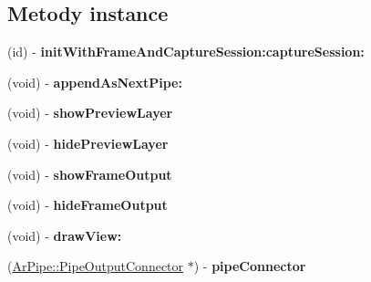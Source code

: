 \subsection*{Metody instance}
\begin{DoxyCompactItemize}
\item 
\hypertarget{interface_base_ar_view_aace15b18427bf737fd3c4273ae9e8c58}{(id) -\/ {\bfseries init\-With\-Frame\-And\-Capture\-Session\-:capture\-Session\-:}}\label{d5/d64/interface_base_ar_view_aace15b18427bf737fd3c4273ae9e8c58}

\item 
\hypertarget{interface_base_ar_view_a0e60ce8ce8fb1adc65ead18a2812a27a}{(void) -\/ {\bfseries append\-As\-Next\-Pipe\-:}}\label{d5/d64/interface_base_ar_view_a0e60ce8ce8fb1adc65ead18a2812a27a}

\item 
\hypertarget{interface_base_ar_view_ac69ba9a0fa58d9621f7e558c41f88471}{(void) -\/ {\bfseries show\-Preview\-Layer}}\label{d5/d64/interface_base_ar_view_ac69ba9a0fa58d9621f7e558c41f88471}

\item 
\hypertarget{interface_base_ar_view_ad94f53f246123743f7c754973e4a4be7}{(void) -\/ {\bfseries hide\-Preview\-Layer}}\label{d5/d64/interface_base_ar_view_ad94f53f246123743f7c754973e4a4be7}

\item 
\hypertarget{interface_base_ar_view_a89c6931f254b4d9a3e79f559bbc2ce35}{(void) -\/ {\bfseries show\-Frame\-Output}}\label{d5/d64/interface_base_ar_view_a89c6931f254b4d9a3e79f559bbc2ce35}

\item 
\hypertarget{interface_base_ar_view_a537347a63628e5c399ed2a610d005870}{(void) -\/ {\bfseries hide\-Frame\-Output}}\label{d5/d64/interface_base_ar_view_a537347a63628e5c399ed2a610d005870}

\item 
\hypertarget{interface_base_ar_view_aeddb63caed1e9a01863351898560af88}{(void) -\/ {\bfseries draw\-View\-:}}\label{d5/d64/interface_base_ar_view_aeddb63caed1e9a01863351898560af88}

\item 
\hypertarget{interface_base_ar_view_af54ad10be4020851537a750a5efefef0}{(\hyperlink{class_ar_pipe_1_1_pipe_output_connector}{Ar\-Pipe\-::\-Pipe\-Output\-Connector} $\ast$) -\/ {\bfseries pipe\-Connector}}\label{d5/d64/interface_base_ar_view_af54ad10be4020851537a750a5efefef0}

\end{DoxyCompactItemize}
